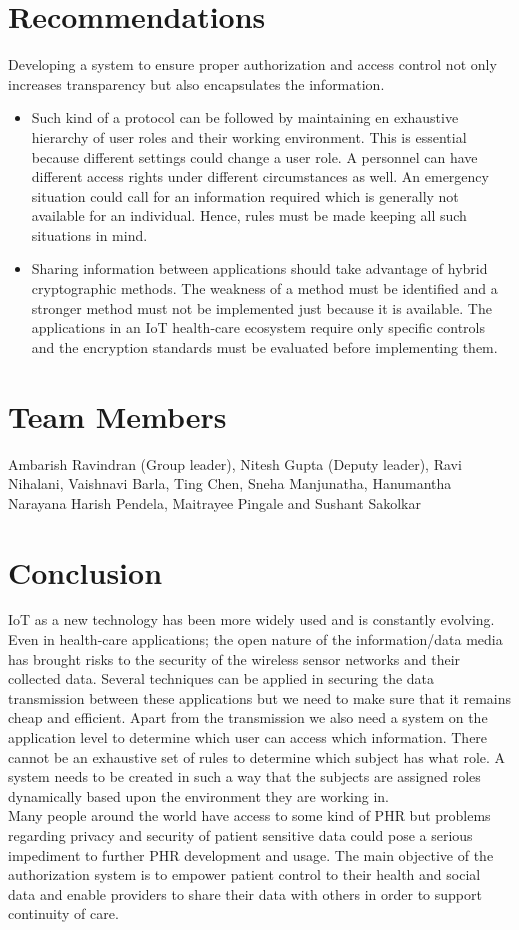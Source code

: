 \documentclass[letterpaper, 10 pt, conference]{ieeeconf}  %
\begin{document}
\section{Recommendations}
Developing a system to ensure proper authorization and access control not only increases transparency but also encapsulates the information. 
\begin{itemize}
\item
Such kind of a protocol can be followed by maintaining en exhaustive hierarchy of user roles and their working environment. This is essential because different settings could change a user role. A personnel can have different access rights under different circumstances as well. An emergency situation could call for an information required which is generally not available for an individual. Hence, rules must be made keeping all such situations in mind.
\item Sharing information between applications should take advantage of hybrid cryptographic methods. The weakness of a method must be identified and a stronger method must not be implemented just because it is available. The applications in an IoT health-care ecosystem require only specific controls and the encryption standards must be evaluated before implementing them.
\end{itemize}

\section{Team Members}
Ambarish Ravindran (Group leader), Nitesh Gupta (Deputy leader), Ravi Nihalani, Vaishnavi Barla, Ting Chen, Sneha Manjunatha, Hanumantha Narayana Harish Pendela, Maitrayee Pingale and Sushant Sakolkar

\section{Conclusion}

IoT as a new technology has been more widely used and is constantly evolving. Even in health-care applications; the open nature of the information/data media has brought risks to the security of the wireless sensor networks and their collected data. Several techniques can be applied in securing the data transmission between these applications but we need to make sure that it remains cheap and efficient. Apart from the transmission we also need a system on the application level to determine which user can access which information. There cannot be an exhaustive set of rules to determine which subject has what role. A system needs to be created in such a way that the subjects are assigned roles dynamically based upon the environment they are
working in.\\
\indent Many people around the world have access to some kind of PHR but problems regarding privacy and security of patient sensitive data could pose a serious impediment to further PHR development and usage. The main objective of the authorization system is to empower patient control to their health and social data and enable providers to share their data with others in order to support continuity of care.
\end{document}
